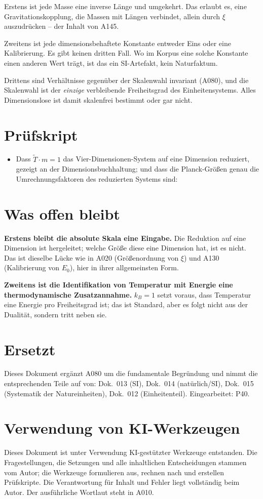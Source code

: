 Erstens ist jede Masse eine inverse Länge und umgekehrt. Das erlaubt es, eine
Gravitationskopplung, die Massen mit Längen verbindet, allein durch $\xi$
auszudrücken -- der Inhalt von A145.

Zweitens ist jede dimensionsbehaftete Konstante entweder Eins oder eine
Kalibrierung. Es gibt keinen dritten Fall. Wo im Korpus eine solche Konstante
einen anderen Wert trägt, ist das ein SI-Artefakt, kein Naturfaktum.

Drittens sind Verhältnisse gegenüber der Skalenwahl invariant (A080), und die
Skalenwahl ist der \emph{einzige} verbleibende Freiheitsgrad des
Einheitensystems. Alles Dimensionslose ist damit skalenfrei bestimmt oder gar
nicht.

\section{Prüfskript}

\begin{itemize}
  \item Dass $\tilde T\cdot m=1$ das Vier-Dimensionen-System auf eine
    Dimension reduziert, gezeigt an der Dimensionsbuchhaltung; und dass die
    Planck-Größen genau die Umrechnungsfaktoren des reduzierten Systems sind:
\end{itemize}

\section{Was offen bleibt}

\textbf{Erstens bleibt die absolute Skala eine Eingabe.} Die Reduktion auf eine
Dimension ist hergeleitet; welche Größe diese eine Dimension hat, ist es nicht.
Das ist dieselbe Lücke wie in A020 (Größenordnung von $\xi$) und A130
(Kalibrierung von $E_0$), hier in ihrer allgemeinsten Form.

\textbf{Zweitens ist die Identifikation von Temperatur mit Energie eine
thermodynamische Zusatzannahme.} $k_B=1$ setzt voraus, dass Temperatur eine
Energie pro Freiheitsgrad ist; das ist Standard, aber es folgt nicht aus der
Dualität, sondern tritt neben sie.

\section{Ersetzt}

Dieses Dokument ergänzt A080 um die fundamentale Begründung und nimmt die
entsprechenden Teile auf von: Dok.~013 (SI), Dok.~014 (natürlich/SI),
Dok.~015 (Systematik der Natureinheiten), Dok.~012 (Einheitenteil).
Eingearbeitet: P40.

\section{Verwendung von KI-Werkzeugen}

Dieses Dokument ist unter Verwendung KI-gestützter Werkzeuge entstanden. Die
Fragestellungen, die Setzungen und alle inhaltlichen Entscheidungen stammen vom
Autor; die Werkzeuge formulieren aus, rechnen nach und erstellen Prüfskripte.
Die Verantwortung für Inhalt und Fehler liegt vollständig beim Autor. Der
ausführliche Wortlaut steht in A010.
